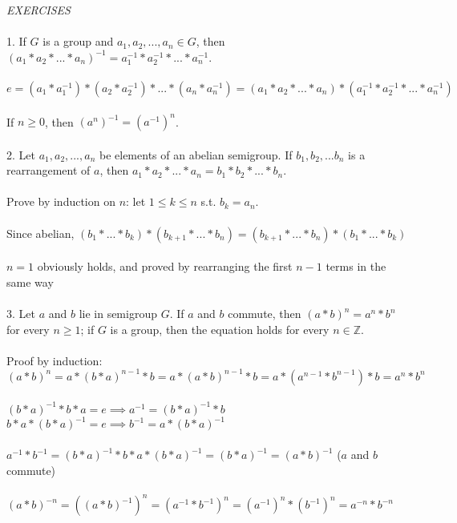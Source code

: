 \documentclass{article}
\begin{document}
\begin{siderules}\color{blue}\textit{EXERCISES}\color{black}\\\\
\color{blue}1. If \(G\) is a group and \(a_{1},a_{2},...,a_{n}\in G\), then \((a_{1}*a_{2}*...*a_{n})^{-1}=a_{1}^{-1}*a_{2}^{-1}*...*a_{n}^{-1}\).\color{black}\\\\
\null\qquad \(e=(a_{1}*a_{1}^{-1})*(a_{2}*a_{2}^{-1})*...*(a_{n}*a_{n}^{-1})=(a_{1}*a_{2}*...*a_{n})*(a_{1}^{-1}*a_{2}^{-1}*...*a_{n}^{-1})\)\\\\
\null\qquad If \(n\ge 0\), then \((a^{n})^{-1}=(a^{-1})^{n}\).\\\\
\color{blue}2. Let \(a_{1},a_{2},...,a_{n}\) be elements of an abelian semigroup. If \(b_{1},b_{2},...b_{n}\) is a rearrangement of \(a\), then \(a_{1}*a_{2}*...*a_{n}=b_{1}*b_{2}*...*b_{n}\).\\\\\color{black}
\null\qquad Prove by induction on \(n\): let \(1\le k\le n\) s.t. \(b_{k}=a_{n}\).\\\\
\null\qquad Since abelian, \((b_{1}*...*b_{k})*(b_{k+1}*...*b_{n})=(b_{k+1}*...*b_{n})*(b_{1}*...*b_{k})\)\\\\
\null\qquad \(n=1\) obviously holds, and proved by rearranging the first \(n-1\) terms in the same way\\\\
\color{blue}3. Let \(a\) and \(b\) lie in semigroup \(G\). If \(a\) and \(b\) commute, then \((a*b)^{n}=a^{n}*b^{n}\) for every \(n\ge 1\); if \(G\) is a group, then the equation holds for every \(n\in\mathbb{Z}\).\\\\\color{black}
\null\qquad Proof by induction: \((a*b)^{n}=a*(b*a)^{n-1}*b=a*(a*b)^{n-1}*b=a*(a^{n-1}*b^{n-1})*b=a^{n}*b^{n}\)\\\\
\null\qquad \((b*a)^{-1}*b*a=e\implies a^{-1}=(b*a)^{-1}*b\) \qquad \(b*a*(b*a)^{-1}=e\implies b^{-1}=a*(b*a)^{-1}\)\\\\
\null\qquad \(a^{-1}*b^{-1}=(b*a)^{-1}*b*a*(b*a)^{-1}=(b*a)^{-1}=(a*b)^{-1}\) \color{gray} (\(a\) and \(b\) commute)\color{black}\\\\
\null\qquad \((a*b)^{-n}=((a*b)^{-1})^{n}=(a^{-1}*b^{-1})^{n}=(a^{-1})^{n}*(b^{-1})^{n}=a^{-n}*b^{-n}\)\\\\

\end{siderules}
\end{document}
